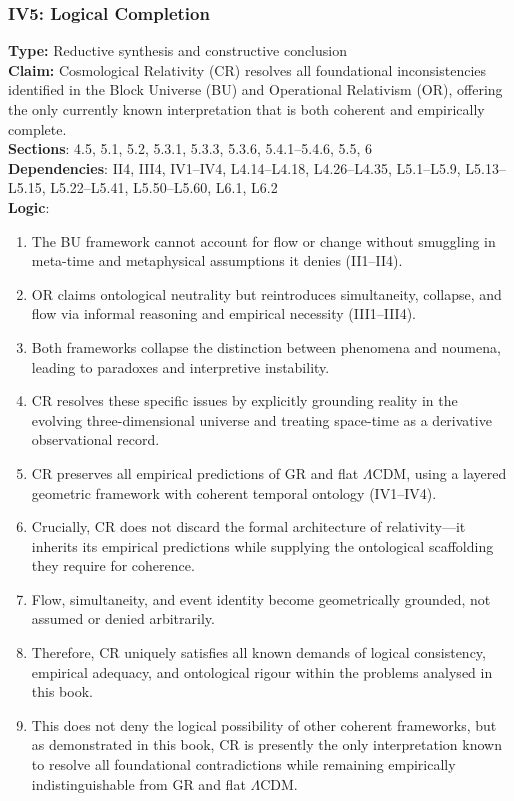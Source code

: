 \documentclass[12pt]{book}
\begin{document}
\subsubsection*{IV5: Logical Completion}
\label{appendix:IV5}
\textbf{Type:} Reductive synthesis and constructive conclusion\\
\textbf{Claim:} Cosmological Relativity (CR) resolves all foundational inconsistencies identified in the Block Universe (BU) and Operational Relativism (OR), offering the only currently known interpretation that is both coherent and empirically complete.\\
\textbf{Sections}: 4.5, 5.1, 5.2, 5.3.1, 5.3.3, 5.3.6, 5.4.1–5.4.6, 5.5, 6\\
\textbf{Dependencies}: II4, III4, IV1–IV4, L4.14–L4.18, L4.26–L4.35, L5.1–L5.9, L5.13–L5.15, L5.22–L5.41, L5.50–L5.60, L6.1, L6.2\\
\textbf{Logic}:
\begin{enumerate}
    \item The BU framework cannot account for flow or change without smuggling in meta-time and metaphysical assumptions it denies (II1–II4).
    \item OR claims ontological neutrality but reintroduces simultaneity, collapse, and flow via informal reasoning and empirical necessity (III1–III4).
    \item Both frameworks collapse the distinction between phenomena and noumena, leading to paradoxes and interpretive instability.
    \item CR resolves these specific issues by explicitly grounding reality in the evolving three-dimensional universe and treating space-time as a derivative observational record.
    \item CR preserves all empirical predictions of GR and flat $\Lambda$CDM, using a layered geometric framework with coherent temporal ontology (IV1–IV4).
    \item Crucially, CR does not discard the formal architecture of relativity---it inherits its empirical predictions while supplying the ontological scaffolding they require for coherence.
    \item Flow, simultaneity, and event identity become geometrically grounded, not assumed or denied arbitrarily.
    \item Therefore, CR uniquely satisfies all known demands of logical consistency, empirical adequacy, and ontological rigour within the problems analysed in this book.
    \item This does not deny the logical possibility of other coherent frameworks, but as demonstrated in this book, CR is presently the only interpretation known to resolve all foundational contradictions while remaining empirically indistinguishable from GR and flat $\Lambda$CDM.
\end{enumerate}
\end{document}
